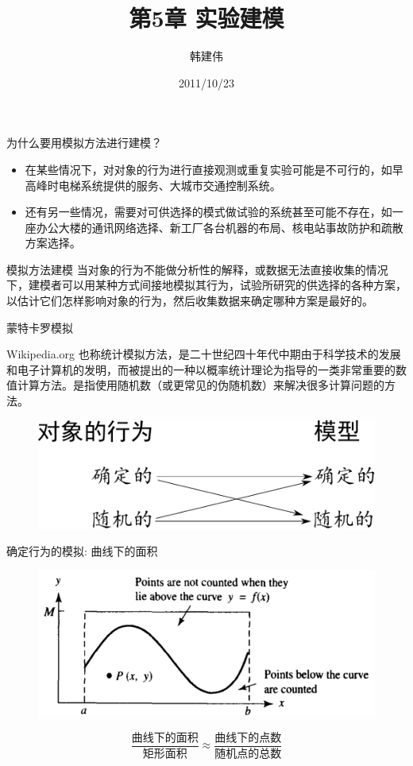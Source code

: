 \documentclass[mathserif, table]{beamer}
\title{第5章 实验建模}
\author{韩建伟}
\institute{
  浙江工商大学信息学院\\
  \texttt{hanjianwei@mail.zjgsu.edu.cn}
}
\date{2011/10/23}
\begin{document}
\begin{frame}[plain]
  \titlepage{}
\end{frame}

\begin{frame}{为什么要用模拟方法进行建模？}

  \begin{itemize}
  \item 在某些情况下，对对象的行为进行直接观测或重复实验可能是不可行的，如早高峰时电梯系统提供的服务、大城市交通控制系统。
  \item 还有另一些情况，需要对可供选择的模式做试验的系统甚至可能不存在，如一座办公大楼的通讯网络选择、新工厂各台机器的布局、核电站事故防护和疏散方案选择。
  \end{itemize}

  \begin{block}{模拟方法建模}
    当对象的行为不能做分析性的解释，或数据无法直接收集的情况下，建模者可以用某种方式间接地模拟其行为，试验所研究的供选择的各种方案，以估计它们怎样影响对象的行为，然后收集数据来确定哪种方案是最好的。
  \end{block}
\end{frame}

\begin{frame}{蒙特卡罗模拟}
  \begin{block}{Wikipedia.org}
    也称统计模拟方法，是二十世纪四十年代中期由于科学技术的发展和电子计算机的发明，而被提出的一种以概率统计理论为指导的一类非常重要的数值计算方法。是指使用随机数（或更常见的伪随机数）来解决很多计算问题的方法。
  \end{block}

  \begin{figure}
    \centering
    \includegraphics[width=.7\textwidth{}]{action-model.pdf}
  \end{figure}
\end{frame}

\begin{frame}{确定行为的模拟: 曲线下的面积}
  \begin{figure}
    \centering
    \includegraphics[width=.7\textwidth{}]{curve.png}
  \end{figure}

  \[
  \frac{\text{曲线下的面积}}{\text{矩形面积}} \approx \frac{\text{曲线下的点数}}{\text{随机点的总数}}
  \]
  
\end{frame}
\end{document}
